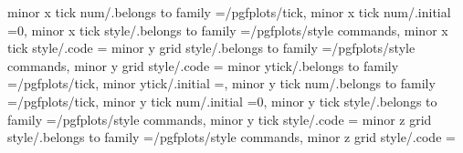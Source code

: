 {{{{{minor x tick num/.belongs to family                                =/pgfplots/tick,                                                                                                                    
minor x tick num/.initial                                          =0,                                                                                                                                 
minor x tick style/.belongs to family                              =/pgfplots/style commands,                                                                                                          
minor x tick style/.code                                           ={                                                                                                                                 
minor y grid style/.belongs to family                              =/pgfplots/style commands,                                                                                                          
minor y grid style/.code                                           ={                                                                                                                                 
minor ytick/.belongs to family                                     =/pgfplots/tick,                                                                                                                    
minor ytick/.initial                                               =,                                                                                                                                  
minor y tick num/.belongs to family                                =/pgfplots/tick,                                                                                                                    
minor y tick num/.initial                                          =0,                                                                                                                                 
minor y tick style/.belongs to family                              =/pgfplots/style commands,                                                                                                          
minor y tick style/.code                                           ={                                                                                                                                 
minor z grid style/.belongs to family                              =/pgfplots/style commands,                                                                                                          
minor z grid style/.code                                           ={                                                                                                                                 
}}}}}}}}}

